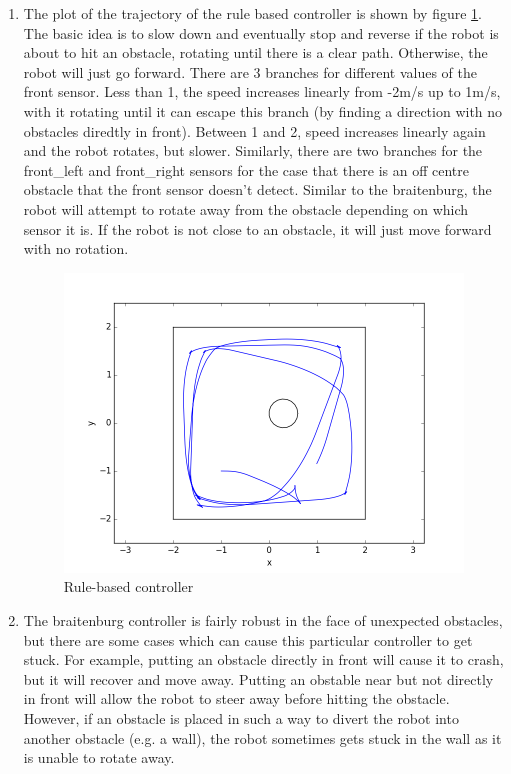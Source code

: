 \documentclass[12pt,a4paper]{article}
\begin{document}
\begin{enumerate}[label=(\alph*)]
		\item The plot of the trajectory of the rule based controller is shown by figure \ref{fig:rule-based}. The basic idea is to slow down and eventually stop and reverse if the robot is about to hit an obstacle, rotating until there is a clear path. Otherwise, the robot will just go forward. There are 3 branches for different values of the front sensor. Less than 1, the speed increases linearly from -2m/s up to 1m/s, with it rotating until it can escape this branch (by finding a direction with no obstacles diredtly in front). Between 1 and 2, speed increases linearly again and the robot rotates, but slower.  Similarly, there are two branches for the front\_left and front\_right sensors for the case that there is an off centre obstacle that the front sensor doesn't detect. Similar to the braitenburg, the robot will attempt to rotate away from the obstacle depending on which sensor it is. If the robot is not close to an obstacle, it will just move forward with no rotation.
		\begin{figure}[h]
			\centering
			\includegraphics[width=\textwidth]{fig/2b.png}
			\caption{Rule-based controller}
			\label{fig:rule-based}
		\end{figure}

		\item The braitenburg controller is fairly robust in the face of unexpected obstacles, but there are some cases which can cause this particular controller to get stuck. For example, putting an obstacle directly in front will cause it to crash, but it will recover and move away. Putting an obstable near but not directly in front will allow the robot to steer away before hitting the obstacle. However, if an obstacle is placed in such a way to divert the robot into another obstacle (e.g. a wall), the robot sometimes gets stuck in the wall as it is unable to rotate away.
		

\end{enumerate}
\end{document}
